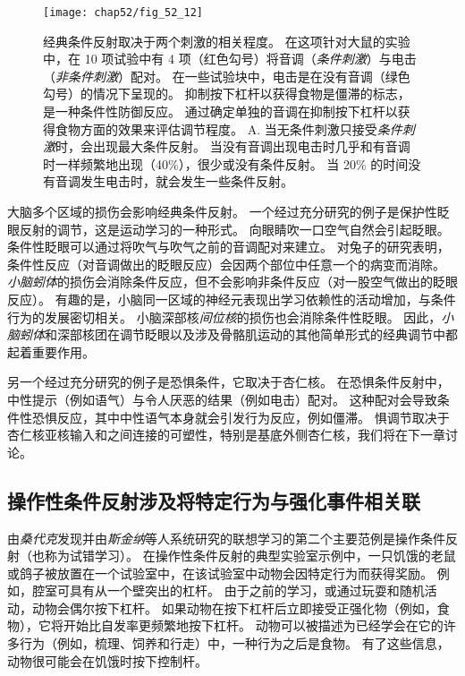 \begin{figure}[htbp]
	\centering
	\texttt{[image: chap52/fig\_52\_12]}
	\caption{经典条件反射取决于两个刺激的相关程度。
		在这项针对大鼠的实验中，在 10 项试验中有 4 项（红色勾号）将音调（\textit{条件刺激}）与电击（\textit{非条件刺激}）配对。
		在一些试验块中，电击是在没有音调（绿色勾号）的情况下呈现的。
		抑制按下杠杆以获得食物是僵滞的标志，是一种条件性防御反应。
		通过确定单独的音调在抑制按下杠杆以获得食物方面的效果来评估调节程度\cite{rescorla1968probability}。
		A. 当无条件刺激只接受\textit{条件刺激}时，会出现最大条件反射。 
		当没有音调出现电击时几乎和有音调时一样频繁地出现（40\%），很少或没有条件反射。
		当 20\% 的时间没有音调发生电击时，就会发生一些条件反射。}
	\label{fig:52_12}
\end{figure}


大脑多个区域的损伤会影响经典条件反射。
一个经过充分研究的例子是保护性眨眼反射的调节，这是运动学习的一种形式。
向眼睛吹一口空气自然会引起眨眼。
条件性眨眼可以通过将吹气与吹气之前的音调配对来建立。
对兔子的研究表明，条件性反应（对音调做出的眨眼反应）会因两个部位中任意一个的病变而消除。
\textit{小脑蚓体}的损伤会消除条件反应，但不会影响非条件反应（对一股空气做出的眨眼反应）。
有趣的是，小脑同一区域的神经元表现出学习依赖性的活动增加，与条件行为的发展密切相关。
小脑深部核\textit{间位核}的损伤也会消除条件性眨眼。
因此，\textit{小脑蚓体}和深部核团在调节眨眼以及涉及骨骼肌运动的其他简单形式的经典调节中都起着重要作用。


另一个经过充分研究的例子是恐惧条件，它取决于杏仁核。
在恐惧条件反射中，中性提示（例如语气）与令人厌恶的结果（例如电击）配对。
这种配对会导致条件性恐惧反应，其中中性语气本身就会引发行为反应，例如僵滞。
惧调节取决于杏仁核亚核输入和之间连接的可塑性，特别是基底外侧杏仁核，我们将在下一章讨论。



\subsection{操作性条件反射涉及将特定行为与强化事件相关联}

由\textit{桑代克}发现并由\textit{斯金纳}等人系统研究的联想学习的第二个主要范例是操作条件反射（也称为试错学习）。
在操作性条件反射的典型实验室示例中，一只饥饿的老鼠或鸽子被放置在一个试验室中，在该试验室中动物会因特定行为而获得奖励。
例如，腔室可具有从一个壁突出的杠杆。 由于之前的学习，或通过玩耍和随机活动，动物会偶尔按下杠杆。
如果动物在按下杠杆后立即接受正强化物（例如，食物），它将开始比自发率更频繁地按下杠杆。
动物可以被描述为已经学会在它的许多行为（例如，梳理、饲养和行走）中，一种行为之后是食物。
有了这些信息，动物很可能会在饥饿时按下控制杆。



